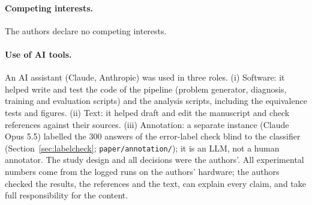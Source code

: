 \documentclass[11pt]{article}
\begin{document}
\paragraph{Competing interests.} The authors declare no competing interests.

\paragraph{Use of AI tools.} An AI assistant (Claude, Anthropic) was used in three roles. (i) Software: it helped
write and test the code of the pipeline (problem generator, diagnosis, training and evaluation scripts) and the analysis
scripts, including the equivalence tests and figures. (ii) Text: it helped draft and edit the manuscript and check
references against their sources. (iii) Annotation: a separate instance (Claude Opus 5.5) labelled the 300 answers of
the error-label check blind to the classifier (Section~\ref{sec:labelcheck}; \texttt{paper/annotation/}); it is an
LLM, not a human annotator. The study design and all decisions were the authors'. All experimental numbers come from the
logged runs on the authors' hardware; the authors checked the results, the references and the text, can
explain every claim, and take full responsibility for the content.



\end{document}
